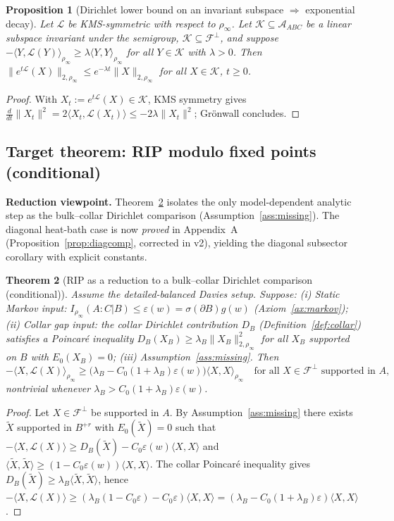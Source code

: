\documentclass[11pt]{article}
\newtheorem{theorem}{Theorem}[section]
\newtheorem{proposition}[theorem]{Proposition}
\theoremstyle{remark}
\begin{document}
\begin{proposition}[Dirichlet lower bound on an invariant subspace
$\Rightarrow$ exponential decay]
\label{prop:gronwall}
Let $\mathcal{L}$ be KMS-symmetric with respect to $\rho_\infty$. Let
$\mathcal{K} \subseteq \mathcal{A}_{ABC}$ be a linear subspace invariant
under the semigroup, $\mathcal{K} \subseteq \mathcal{F}^\perp$, and
suppose $-\langle Y, \mathcal{L}(Y)\rangle_{\rho_\infty} \ge \lambda
\langle Y, Y\rangle_{\rho_\infty}$ for all $Y \in \mathcal{K}$ with
$\lambda > 0$. Then $\|e^{t\mathcal{L}}(X)\|_{2,\rho_\infty} \le
e^{-\lambda t}\|X\|_{2,\rho_\infty}$ for all $X \in \mathcal{K}$, $t\ge0$.
\end{proposition}
\begin{proof}
With $X_t := e^{t\mathcal{L}}(X) \in \mathcal{K}$, KMS symmetry gives
$\frac{d}{dt}\|X_t\|^2 = 2\langle X_t, \mathcal{L}(X_t)\rangle \le
-2\lambda\|X_t\|^2$; Gr\"onwall concludes.
\end{proof}

\subsection{Target theorem: RIP modulo fixed points (conditional)}
\textbf{Reduction viewpoint.} Theorem~\ref{thm:rip} isolates the only
model-dependent analytic step as the bulk--collar Dirichlet comparison
(Assumption~\ref{ass:missing}). The diagonal heat-bath case is now
\emph{proved} in Appendix~A (Proposition~\ref{prop:diagcomp}, corrected in
v2), yielding the diagonal subsector corollary with explicit constants.

\begin{theorem}[RIP as a reduction to a bulk--collar Dirichlet comparison
(conditional)]
\label{thm:rip}
Assume the detailed-balanced Davies setup. Suppose:
(i) \emph{Static Markov input:} $I_{\rho_\infty}(A:C|B) \le
\varepsilon(w) = \sigma(\partial B) g(w)$ (Axiom~\ref{ax:markov});
(ii) \emph{Collar gap input:} the collar Dirichlet contribution
$D_B$ (Definition~\ref{def:collar}) satisfies a Poincar\'e inequality
$D_B(X_B) \ge \lambda_B \|X_B\|^2_{2,\rho_\infty}$ for all $X_B$ supported
on $B$ with $E_0(X_B) = 0$;
(iii) Assumption~\ref{ass:missing}. Then
\[
-\langle X, \mathcal{L}(X)\rangle_{\rho_\infty} \ge
\bigl( \lambda_B - C_0(1+\lambda_B)\varepsilon(w) \bigr)
\langle X, X\rangle_{\rho_\infty}
\quad\text{for all } X \in \mathcal{F}^\perp \text{ supported in } A,
\]
nontrivial whenever $\lambda_B > C_0(1+\lambda_B)\varepsilon(w)$.
\end{theorem}
\begin{proof}
Let $X \in \mathcal{F}^\perp$ be supported in $A$. By
Assumption~\ref{ass:missing} there exists $\tilde X$ supported in $B^{+r}$
with $E_0(\tilde X) = 0$ such that
$-\langle X,\mathcal{L}(X)\rangle \ge D_B(\tilde X) -
C_0\varepsilon(w)\langle X,X\rangle$ and
$\langle\tilde X,\tilde X\rangle \ge (1 - C_0\varepsilon(w))
\langle X,X\rangle$. The collar Poincar\'e inequality gives
$D_B(\tilde X) \ge \lambda_B \langle\tilde X,\tilde X\rangle$, hence
$-\langle X,\mathcal{L}(X)\rangle \ge (\lambda_B(1 - C_0\varepsilon) -
C_0\varepsilon)\langle X,X\rangle = (\lambda_B -
C_0(1+\lambda_B)\varepsilon)\langle X,X\rangle$.
\end{proof}
\end{document}

